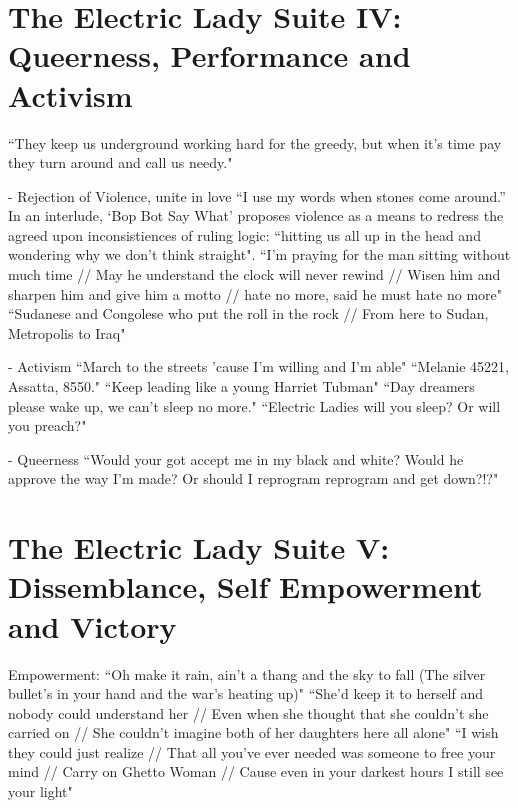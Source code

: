 \documentclass[a4paper, 11pt]{article} %
\begin{document}
\section*{The Electric Lady Suite IV: Queerness, Performance and Activism}

``They keep us underground working hard for the greedy, but when it's time pay they turn around and call us needy."\cite{queen}

- Rejection of Violence, unite in love
``I use my words when stones come around.''\cite{manymoons}
In an interlude, `Bop Bot Say What' proposes violence as a means to redress the agreed upon inconsistiences of ruling logic: ``hitting us all up in the head and wondering why we don't think straight"\cite{chromeshoppe}.
``I'm praying for the man sitting without much time // May he understand the clock will never rewind // Wisen him and sharpen him and give him a motto // hate no more, said he must hate no more"\cite{danceordie}
``Sudanese and Congolese who put the roll in the rock // From here to Sudan, Metropolis to Iraq"\cite{danceordie}

- Activism
``March to the streets 'cause I'm willing and I'm able"\cite{queen}
``Melanie 45221, Assatta, 8550."\cite{chromeshoppe}
``Keep leading like a young Harriet Tubman"\cite{queen}
``Day dreamers please wake up, we can't sleep no more."\cite{sincerelyjane}
``Electric Ladies will you sleep? Or will you preach?"\cite{queen}

- Queerness
``Would your got accept me in my black and white? Would he approve the way I'm made? Or should I reprogram reprogram and get down?!?"\cite{queen}



\section*{The Electric Lady Suite V: Dissemblance, Self Empowerment and Victory}

Empowerment: 
``Oh make it rain, ain't a thang and the sky to fall (The silver bullet's in your hand and the war's heating up)" \cite{manymoons}
``She'd keep it to herself and nobody could understand her // Even when she thought that she couldn't she carried on // She couldn't imagine both of her daughters here all alone"\cite{ghettowoman}
``I wish they could just realize // That all you've ever needed was someone to free your mind // Carry on Ghetto Woman // Cause even in your darkest hours I still see your light" \cite{ghettowoman}
\end{document}
